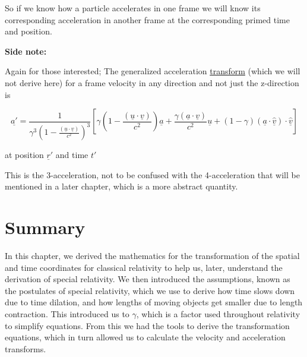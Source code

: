 So if we know how a particle accelerates in one frame we will know its corresponding acceleration in another frame at the corresponding primed time and position.

\textbf{Side note:}

Again for those interested; The generalized acceleration \hyperlink{def-transform}{transform} (which we will not derive here) for a frame velocity in any direction and not just the z-direction is

\begin{equation}
	\underline{a{'}} = \frac{1}{{\gamma} ^3 \left(1-\frac{(\underline{u}\cdot \underline{v})}{{c}^2}\right)^3}\left[ {\gamma} \left(1-\frac{(\underline{u}\cdot\underline{v})}{{c}^2}\right)\underline{a} + \frac{{\gamma} (\underline{a}\cdot\underline{v})}{{c}^2}\underline{u} + (1-{\gamma} ) (\underline{a}\cdot\hat{\underline{v}}) \cdot\hat{\underline{v}}\right]
\end{equation}

at position ${\underline{r}{'}}$ and time ${t{'}}$

This is the 3-acceleration, not to be confused with the 4-acceleration that will be mentioned in a later chapter, which is a more abstract quantity.

\section{Summary}\label{sect: Summary chapter 2}

In this chapter, we derived the mathematics for the transformation of the spatial and time coordinates for classical relativity to help us, later, understand the derivation of special relativity.
We then introduced the assumptions, known as the postulates of special relativity, which we use to derive how time slows down due to time dilation, and how lengths of moving objects get smaller due to length contraction.
This introduced us to $\gamma$, which is a factor used throughout relativity to simplify equations.
From this we had the tools to derive the transformation equations, which in turn allowed us to calculate the velocity and acceleration transforms.


